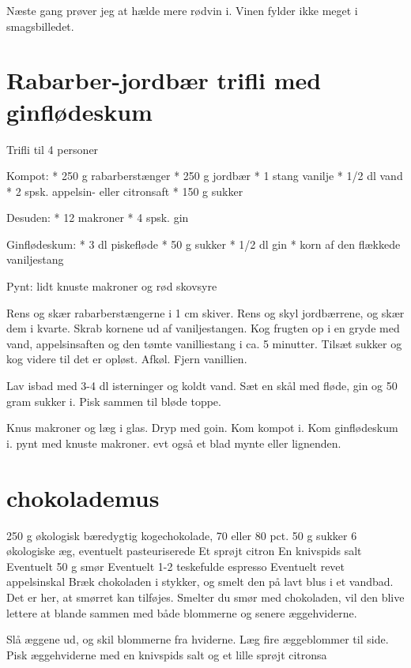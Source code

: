\documentclass[
  letterpaper,
  DIV=11,
  numbers=noendperiod]{scrreprt}
\begin{document}
Næste gang prøver jeg at hælde mere rødvin i. Vinen fylder ikke meget i
smagsbilledet.

\hypertarget{rabarber-jordbuxe6r-trifli-med-ginfluxf8deskum}{%
\section{Rabarber-jordbær trifli med
ginflødeskum}\label{rabarber-jordbuxe6r-trifli-med-ginfluxf8deskum}}

Trifli til 4 personer

Kompot: * 250 g rabarberstænger * 250 g jordbær * 1 stang vanilje * 1/2
dl vand * 2 spsk. appelsin- eller citronsaft * 150 g sukker

Desuden: * 12 makroner * 4 spsk. gin

Ginflødeskum: * 3 dl piskefløde * 50 g sukker * 1/2 dl gin * korn af den
flækkede vaniljestang

Pynt: lidt knuste makroner og rød skovsyre

Rens og skær rabarberstængerne i 1 cm skiver. Rens og skyl jordbærrene,
og skær dem i kvarte. Skrab kornene ud af vaniljestangen. Kog frugten op
i en gryde med vand, appelsinsaften og den tømte vanilliestang i ca. 5
minutter. Tilsæt sukker og kog videre til det er opløst. Afkøl. Fjern
vanillien.

Lav isbad med 3-4 dl isterninger og koldt vand. Sæt en skål med fløde,
gin og 50 gram sukker i. Pisk sammen til bløde toppe.

Knus makroner og læg i glas. Dryp med goin. Kom kompot i. Kom
ginflødeskum i. pynt med knuste makroner. evt også et blad mynte eller
lignenden.

\hypertarget{chokolademus}{%
\section{chokolademus}\label{chokolademus}}

250 g økologisk bæredygtig kogechokolade, 70 eller 80 pct. 50 g sukker 6
økologiske æg, eventuelt pasteuriserede Et sprøjt citron En knivspids
salt Eventuelt 50 g smør Eventuelt 1-2 teskefulde espresso Eventuelt
revet appelsinskal Bræk chokoladen i stykker, og smelt den på lavt blus
i et vandbad. Det er her, at smørret kan tilføjes. Smelter du smør med
chokoladen, vil den blive lettere at blande sammen med både blommerne og
senere æggehviderne.

Slå æggene ud, og skil blommerne fra hviderne. Læg fire æggeblommer til
side. Pisk æggehviderne med en knivspids salt og et lille sprøjt
citronsa
\end{document}
